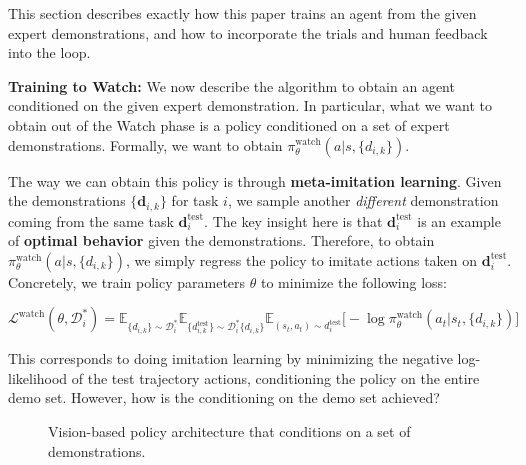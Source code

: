 \documentclass[
  letterpaper,
  numbers=noenddot,
  DIV=11,
  oneside]{scrreprt}
\theoremstyle{remark}
\begin{document}
This section describes exactly how this paper trains an agent from the
given expert demonstrations, and how to incorporate the trials and human
feedback into the loop.

\textbf{Training to Watch:} We now describe the algorithm to obtain an
agent conditioned on the given expert demonstration. In particular, what
we want to obtain out of the Watch phase is a policy conditioned on a
set of expert demonstrations. Formally, we want to obtain
\(\pi_\theta^{\text{watch}}(a | s, \{d_{i,k}\})\).

The way we can obtain this policy is through \textbf{meta-imitation
learning}. Given the demonstrations \(\{\textbf{d}_{i,k}\}\) for task
\(i\), we sample another \emph{different} demonstration coming from the
same task \(\textbf{d}_i^{\text{test}}\). The key insight here is that
\(\textbf{d}_i^{\text{test}}\) is an example of \textbf{optimal
behavior} given the demonstrations. Therefore, to obtain
\(\pi_\theta^{\text{watch}}(a | s, \{d_{i,k}\})\), we simply regress the
policy to imitate actions taken on \(\textbf{d}_i^{\text{test}}\).
Concretely, we train policy parameters \(\theta\) to minimize the
following loss:

\(\mathcal{L}^\text{watch}(\theta, \mathcal{D}_i^*) = \mathbb{E}_{\{d_{i,k}\} \sim \mathcal{D}_i^*} \mathbb{E}_{\{d_{i,k}^{\text{test}}\} \sim \mathcal{D}_i^*  \{d_{i,k}\}} \mathbb{E}_{(s_t, a_t) \sim d_i^{\text{test}}} \big[
- \log \pi_\theta^{\text{watch}} (a_t | s_t, \{d_{i,k}\}) \big]\)

This corresponds to doing imitation learning by minimizing the negative
log-likelihood of the test trajectory actions, conditioning the policy
on the entire demo set. However, how is the conditioning on the demo set
achieved?

\begin{figure}


\caption{\label{fig-watch-try-learn-arch}Vision-based policy
architecture that conditions on a set of demonstrations.}

\end{figure}%
\end{document}
